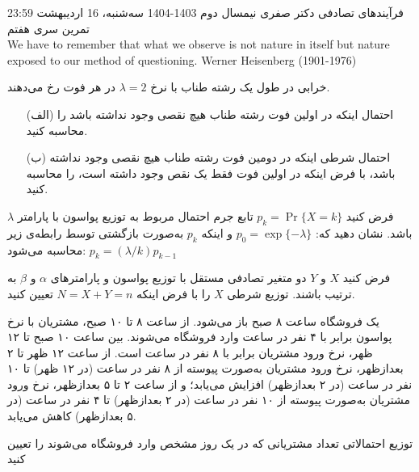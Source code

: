 \documentclass[11pt, a4, twoside]{article}
\begin{document}
	\pagestyle{empty}
	\heading
	{فرآیندهای تصادفی}
	{دکتر صفری}
	{نیمسال دوم 1403-1404}
    {سه‌شنبه، 16 اردیبهشت 23:59}
    {تمرین سری هفتم}
	\inspiringQuotation
	{\\We have to remember that what we observe is not nature in itself but nature exposed to our method of questioning.}
	{Werner Heisenberg (1901-1976)}
	\begin{problem}
		خرابی در طول یک رشته طناب با نرخ $\lambda = 2$ در هر فوت رخ می‌دهند.

		\begin{itemize}
		\item[(الف)] احتمال اینکه در اولین فوت رشته طناب هیچ نقصی وجود نداشته باشد را محاسبه کنید.
		\item[(ب)] احتمال شرطی اینکه در دومین فوت رشته طناب هیچ نقصی وجود نداشته باشد، با فرض اینکه در اولین فوت فقط یک نقص وجود داشته است، را محاسبه کنید.
		\end{itemize}
	\end{problem}

	\begin{problem}			
		فرض کنید $p_k = \Pr\{X = k\}$ تابع جرم احتمال مربوط به توزیع پواسون با پارامتر $\lambda$ باشد. نشان دهید که:
		\(
		p_0 = \exp\{-\lambda\}
		\)
		و اینکه $p_k$ به‌صورت بازگشتی توسط رابطه‌ی زیر محاسبه می‌شود:
		\(
		p_k = (\lambda / k) p_{k-1}
		\)
	\end{problem}
	\begin{problem}
		فرض کنید $X$ و $Y$ دو متغیر تصادفی مستقل با توزیع پواسون و پارامترهای $\alpha$ و $\beta$ به ترتیب باشند. توزیع شرطی $X$ را با فرض اینکه $N = X + Y = n$ تعیین کنید.
	\end{problem}

	\begin{problem}
		یک فروشگاه ساعت ۸ صبح باز می‌شود. از ساعت ۸ تا ۱۰ صبح، مشتریان با نرخ پواسون برابر با ۴ نفر در ساعت وارد فروشگاه می‌شوند. بین ساعت ۱۰ صبح تا ۱۲ ظهر، نرخ ورود مشتریان برابر با ۸ نفر در ساعت است. از ساعت ۱۲ ظهر تا ۲ بعدازظهر، نرخ ورود مشتریان به‌صورت پیوسته از ۸ نفر در ساعت (در ۱۲ ظهر) تا ۱۰ نفر در ساعت (در ۲ بعدازظهر) افزایش می‌یابد؛ و از ساعت ۲ تا ۵ بعدازظهر، نرخ ورود مشتریان به‌صورت پیوسته از ۱۰ نفر در ساعت (در ۲ بعدازظهر) تا ۴ نفر در ساعت (در ۵ بعدازظهر) کاهش می‌یابد. 

		توزیع احتمالاتی تعداد مشتریانی که در یک روز مشخص وارد فروشگاه می‌شوند را تعیین کنید
	\end{problem}
\end{document}
